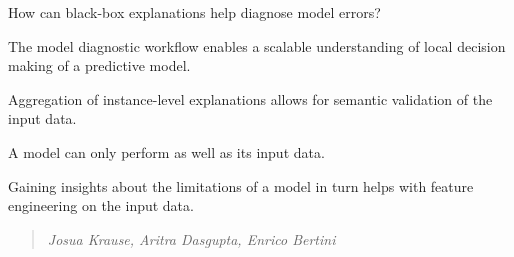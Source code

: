 
\begin{contributions}{How can black-box explanations help diagnose model errors?}
\item The model diagnostic workflow enables a scalable understanding of local decision making of a predictive model.
\item Aggregation of instance-level explanations allows for semantic validation of the input data.
\item A model can only perform as well as its input data.
\item Gaining insights about the limitations of a model in turn helps with feature engineering on the input data.
\end{contributions}

\begin{quote}
\textit{Josua Krause, Aritra Dasgupta, Enrico Bertini}
\end{quote}